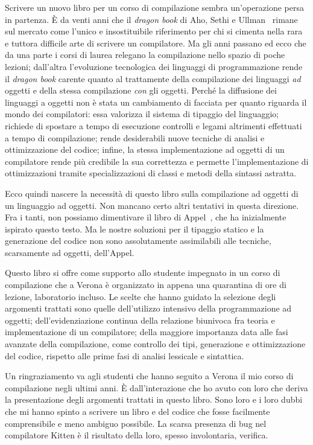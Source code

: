 Scrivere un nuovo libro per un corso di compilazione sembra
un'operazione persa in partenza. \`E da venti anni che il
\emph{dragon book} di Aho, Sethi e Ullman~\cite{AhoSU86}
rimane sul mercato come
l'unico e insostituibile riferimento per chi si cimenta nella rara
e tuttora difficile arte di scrivere un compilatore. Ma gli anni passano
ed ecco che da una parte i corsi di laurea relegano la compilazione
nello spazio di poche lezioni; dall'altra l'evoluzione tecnologica dei
linguaggi di programmazione rende il \emph{dragon book} carente quanto
al trattamente della compilazione dei linguaggi \emph{ad} oggetti
e della stessa compilazione \emph{con} gli oggetti. Perch\'e
la diffusione dei linguaggi a oggetti non \`e stata un cambiamento di
facciata per quanto riguarda il mondo dei compilatori: essa valorizza
il sistema di tipaggio del linguaggio; richiede
di spostare a tempo di esecuzione controlli e legami altrimenti
effettuati a tempo di compilazione; rende desiderabili nuove tecniche
di analisi e ottimizzazione del codice; infine, la stessa
implementazione ad oggetti di un compilatore
rende pi\`u credibile la sua correttezza e permette l'implementazione
di ottimizzazioni tramite specializzazioni di classi e metodi della
sintassi astratta.

Ecco quindi nascere la necessit\`a di questo libro sulla
compilazione ad oggetti di un linguaggio ad oggetti. Non mancano certo
altri tentativi in questa direzione. Fra i tanti, non possiamo dimentivare
il libro di Appel~\cite{Appel02},
che ha inizialmente ispirato questo testo. Ma le
nostre soluzioni per il tipaggio statico e la generazione del codice
non sono assolutamente assimilabili alle tecniche, scarsamente ad oggetti,
dell'Appel.

Questo libro si offre come supporto allo studente impegnato in un corso
di compilazione che a Verona \`e organizzato in appena
una quarantina di ore
di lezione, laboratorio incluso. Le scelte
che hanno guidato la selezione degli argomenti trattati sono quelle
dell'utilizzo intensivo della programmazione ad oggetti; dell'evidenziazione
continua della relazione biunivoca fra teoria e implementazione di
un compilatore; della maggiore
importanza data alle fasi avanzate della compilazione,
come controllo dei tipi, generazione e ottimizzazione del codice,
rispetto alle prime fasi di analisi lessicale e sintattica.

Un ringraziamento va agli studenti che hanno seguito a Verona
il mio corso di compilazione negli ultimi anni. \`E dall'interazione
che ho avuto con loro che deriva la presentazione degli argomenti trattati
in questo libro. Sono loro e i loro dubbi che mi hanno spinto a
scrivere un libro e del codice che fosse
facilmente comprensibile e meno ambiguo possibile.
La scarsa presenza di bug nel compilatore Kitten \`e il risultato
della loro, spesso involontaria, verifica.

